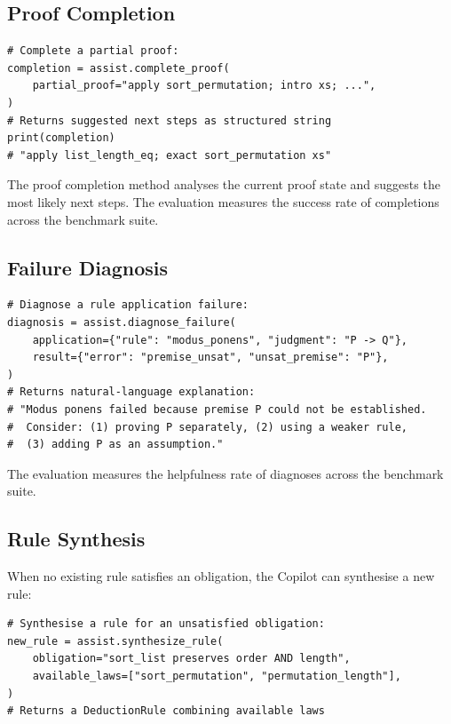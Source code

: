 \documentclass[11pt]{article}
\begin{document}
\subsection{Proof Completion}

\begin{lstlisting}[style=jugeo-python]
# Complete a partial proof:
completion = assist.complete_proof(
    partial_proof="apply sort_permutation; intro xs; ...",
)
# Returns suggested next steps as structured string
print(completion)
# "apply list_length_eq; exact sort_permutation xs"
\end{lstlisting}

The proof completion method analyses the current proof state and suggests the
most likely next steps.  The evaluation measures the success rate of
completions across the benchmark suite.

\subsection{Failure Diagnosis}

\begin{lstlisting}[style=jugeo-python]
# Diagnose a rule application failure:
diagnosis = assist.diagnose_failure(
    application={"rule": "modus_ponens", "judgment": "P -> Q"},
    result={"error": "premise_unsat", "unsat_premise": "P"},
)
# Returns natural-language explanation:
# "Modus ponens failed because premise P could not be established.
#  Consider: (1) proving P separately, (2) using a weaker rule,
#  (3) adding P as an assumption."
\end{lstlisting}

The evaluation measures the helpfulness rate of diagnoses across
the benchmark suite.

\subsection{Rule Synthesis}

When no existing rule satisfies an obligation, the Copilot can synthesise a
new rule:

\begin{lstlisting}[style=jugeo-python]
# Synthesise a rule for an unsatisfied obligation:
new_rule = assist.synthesize_rule(
    obligation="sort_list preserves order AND length",
    available_laws=["sort_permutation", "permutation_length"],
)
# Returns a DeductionRule combining available laws
\end{lstlisting}
\end{document}
